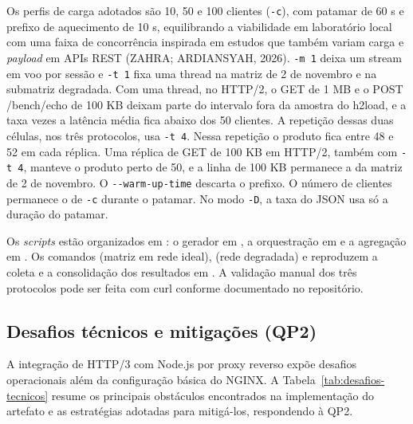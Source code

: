 Os perfis de carga adotados são 10, 50 e 100 clientes (\texttt{-c}), com patamar de 60 s e prefixo de aquecimento de 10 s, equilibrando a viabilidade em laboratório local com uma faixa de concorrência inspirada em estudos que também variam carga e \textit{payload} em APIs REST (ZAHRA; ARDIANSYAH, 2026). \texttt{-m 1} deixa um stream em voo por sessão e \texttt{-t 1} fixa uma thread na matriz de 2 de novembro e na submatriz degradada. Com uma thread, no HTTP/2, o GET de 1 MB e o POST /bench/echo de 100 KB deixam parte do intervalo fora da amostra do h2load, e a taxa vezes a latência média fica abaixo dos 50 clientes. A repetição dessas duas células, nos três protocolos, usa \texttt{-t 4}. Nessa repetição o produto fica entre 48 e 52 em cada réplica. Uma réplica de GET de 100 KB em HTTP/2, também com \texttt{-t 4}, manteve o produto perto de 50, e a linha de 100 KB permanece a da matriz de 2 de novembro. O \texttt{-{}-warm-up-time} descarta o prefixo. O número de clientes permanece o de \texttt{-c} durante o patamar. No modo \texttt{-D}, a taxa do JSON usa só a duração do patamar.

Os \textit{scripts} estão organizados em : o gerador em , a orquestração em  e a agregação em . Os comandos  (matriz em rede ideal),  (rede degradada) e  reproduzem a coleta e a consolidação dos resultados em . A validação manual dos três protocolos pode ser feita com curl conforme documentado no repositório.

\subsection{Desafios técnicos e mitigações (QP2)}\label{sec:desafios-qp2}

A integração de HTTP/3 com Node.js por proxy reverso expõe desafios operacionais além da configuração básica do NGINX. A Tabela~\ref{tab:desafios-tecnicos} resume os principais obstáculos encontrados na implementação do artefato e as estratégias adotadas para mitigá-los, respondendo à QP2.


